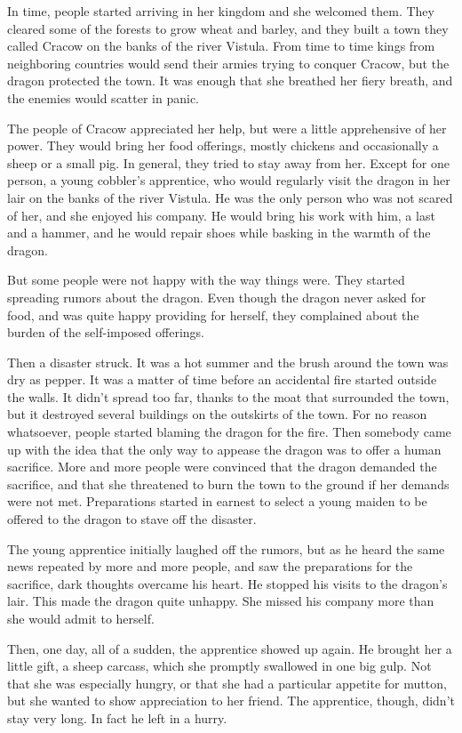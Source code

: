 \documentclass{memoir}
\begin{document}
In time, people started arriving in her kingdom and she welcomed them. They cleared some of the forests to grow wheat and barley, and they built a town they called Cracow on the banks of the river Vistula. From time to time kings from neighboring countries would send their armies trying to conquer Cracow, but the dragon protected the town. It was enough that she breathed her fiery breath, and the enemies would scatter in panic. 

The people of Cracow appreciated her help, but were a little apprehensive of her power. They would bring her food offerings, mostly chickens and occasionally a sheep or a small pig. In general, they tried to stay away from her. Except for one person, a young cobbler's apprentice, who would regularly visit the dragon in her lair on the banks of the river Vistula. He was the only person who was not scared of her, and she enjoyed his company. He would bring his work with him, a last and a hammer, and he would repair shoes while basking in the warmth of the dragon.

But some people were not happy with the way things were. They started spreading rumors about the dragon. Even though the dragon never asked for food, and was quite happy providing for herself, they complained about the burden of the self-imposed offerings. 

Then a disaster struck. It was a hot summer and the brush around the town was dry as pepper. It was a matter of time before an accidental fire started outside the walls. It didn't spread too far, thanks to the moat that surrounded the town, but it destroyed several buildings on the outskirts of the town. For no reason whatsoever, people started blaming the dragon for the fire. Then somebody came up with the idea that the only way to appease the dragon was to offer a human sacrifice. More and more people were convinced that the dragon demanded the sacrifice, and that she threatened to burn the town to the ground if her demands were not met. Preparations started in earnest to select a young maiden to be offered to the dragon to stave off the disaster.

The young apprentice initially laughed off the rumors, but as he heard the same news repeated by more and more people, and saw the preparations for the sacrifice, dark thoughts overcame his heart. He stopped his visits to the dragon's lair. This made the dragon quite unhappy. She missed his company more than she would admit to herself. 

Then, one day, all of a sudden, the apprentice showed up again. He brought her a little gift, a sheep carcass, which she promptly swallowed in one big gulp. Not that she was especially hungry, or that she had a particular appetite for mutton, but she wanted to show appreciation to her friend. The apprentice, though, didn't stay very long. In fact he left in a hurry. 
\end{document}
